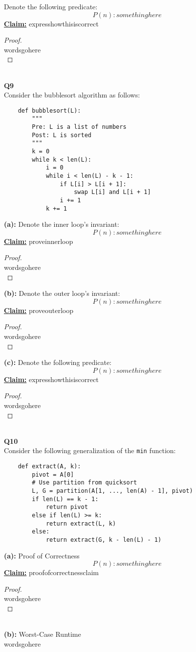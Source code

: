 \documentclass[12pt]{article}
\begin{document}
Denote the following predicate:
\[P(n): somethinghere\]
\textbf{\underline{Claim:}} expresshowthisiscorrect
\begin{proof}
\leavevmode\\
    wordsgohere \\
\end{proof}
\leavevmode\\
\textbf{Q9} \\
Consider the bubblesort algorithm as follows:
\begin{lstlisting}
    def bubblesort(L):
        """
        Pre: L is a list of numbers
        Post: L is sorted
        """
        k = 0
        while k < len(L):
            i = 0
            while i < len(L) - k - 1:
                if L[i] > L[i + 1]:
                    swap L[i] and L[i + 1]
                i += 1
            k += 1
\end{lstlisting}
\textbf{(a):} Denote the inner loop's invariant:
\[P(n): somethinghere\]
\textbf{\underline{Claim:}} proveinnerloop
\begin{proof}
\leavevmode\\
    wordsgohere \\
\end{proof}
\leavevmode
\textbf{(b):} Denote the outer loop's invariant:
\[P(n): somethinghere\]
\textbf{\underline{Claim:}} proveouterloop
\begin{proof}
\leavevmode\\
    wordsgohere \\
\end{proof}
\leavevmode
\textbf{(c):} Denote the following predicate:
\[P(n): somethinghere\]
\textbf{\underline{Claim:}} expresshowthisiscorrect
\begin{proof}
\leavevmode\\
    wordsgohere \\
\end{proof}
\leavevmode\\
\textbf{Q10} \\
Consider the following generalization of the \texttt{min} function:
\begin{lstlisting}
    def extract(A, k):
        pivot = A[0]
        # Use partition from quicksort
        L, G = partition(A[1, ..., len(A) - 1], pivot)
        if len(L) == k - 1:
            return pivot
        else if len(L) >= k:
            return extract(L, k)
        else:
            return extract(G, k - len(L) - 1)
\end{lstlisting}
\textbf{(a):} Proof of Correctness \\
\[P(n): somethinghere\]
\textbf{\underline{Claim:}} proofofcorrectnessclaim
\begin{proof}
\leavevmode\\
    wordsgohere \\
\end{proof}
\leavevmode\\
\textbf{(b):} Worst-Case Runtime \\
wordsgohere \\
\\
\pagebreak
\end{document}
